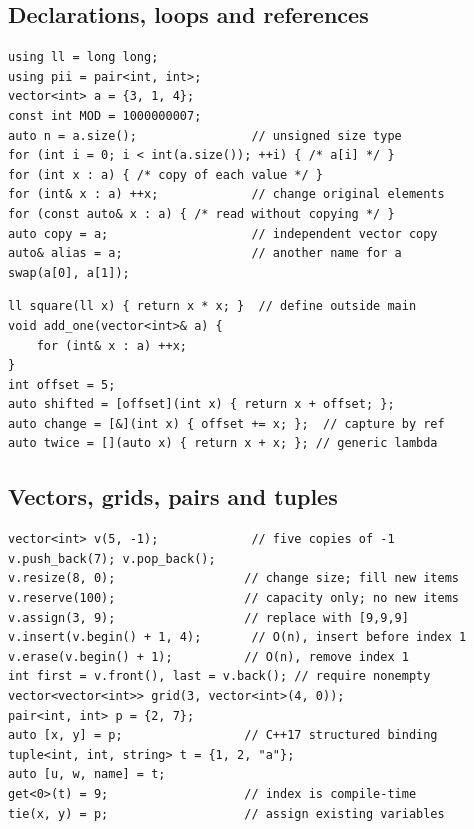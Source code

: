 \subsection{Declarations, loops and references}\label{cpp:syntax}
\begin{lstlisting}[style=cpp]
using ll = long long;
using pii = pair<int, int>;
vector<int> a = {3, 1, 4};
const int MOD = 1000000007;
auto n = a.size();                // unsigned size type
for (int i = 0; i < int(a.size()); ++i) { /* a[i] */ }
for (int x : a) { /* copy of each value */ }
for (int& x : a) ++x;             // change original elements
for (const auto& x : a) { /* read without copying */ }
auto copy = a;                    // independent vector copy
auto& alias = a;                  // another name for a
swap(a[0], a[1]);
\end{lstlisting}
\begin{lstlisting}[style=cpp]
ll square(ll x) { return x * x; }  // define outside main
void add_one(vector<int>& a) {
    for (int& x : a) ++x;
}
int offset = 5;
auto shifted = [offset](int x) { return x + offset; };
auto change = [&](int x) { offset += x; };  // capture by ref
auto twice = [](auto x) { return x + x; }; // generic lambda
\end{lstlisting}

\subsection{Vectors, grids, pairs and tuples}\label{cpp:containers}
\begin{lstlisting}[style=cpp]
vector<int> v(5, -1);             // five copies of -1
v.push_back(7); v.pop_back();
v.resize(8, 0);                  // change size; fill new items
v.reserve(100);                  // capacity only; no new items
v.assign(3, 9);                  // replace with [9,9,9]
v.insert(v.begin() + 1, 4);       // O(n), insert before index 1
v.erase(v.begin() + 1);          // O(n), remove index 1
int first = v.front(), last = v.back(); // require nonempty
vector<vector<int>> grid(3, vector<int>(4, 0));
pair<int, int> p = {2, 7};
auto [x, y] = p;                 // C++17 structured binding
tuple<int, int, string> t = {1, 2, "a"};
auto [u, w, name] = t;
get<0>(t) = 9;                   // index is compile-time
tie(x, y) = p;                   // assign existing variables
\end{lstlisting}

